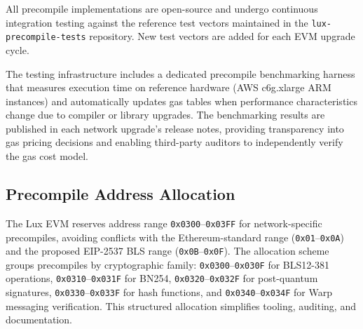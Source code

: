 \documentclass[11pt,a4paper]{article}
\begin{document}
All precompile implementations are open-source and undergo continuous integration testing against the reference test vectors maintained in the \texttt{lux-precompile-tests} repository. New test vectors are added for each EVM upgrade cycle.

The testing infrastructure includes a dedicated precompile benchmarking harness that measures execution time on reference hardware (AWS c6g.xlarge ARM instances) and automatically updates gas tables when performance characteristics change due to compiler or library upgrades. The benchmarking results are published in each network upgrade's release notes, providing transparency into gas pricing decisions and enabling third-party auditors to independently verify the gas cost model.

\subsection{Precompile Address Allocation}

The Lux EVM reserves address range \texttt{0x0300}--\texttt{0x03FF} for network-specific precompiles, avoiding conflicts with the Ethereum-standard range (\texttt{0x01}--\texttt{0x0A}) and the proposed EIP-2537 BLS range (\texttt{0x0B}--\texttt{0x0F}). The allocation scheme groups precompiles by cryptographic family: \texttt{0x0300}--\texttt{0x030F} for BLS12-381 operations, \texttt{0x0310}--\texttt{0x031F} for BN254, \texttt{0x0320}--\texttt{0x032F} for post-quantum signatures, \texttt{0x0330}--\texttt{0x033F} for hash functions, and \texttt{0x0340}--\texttt{0x034F} for Warp messaging verification. This structured allocation simplifies tooling, auditing, and documentation.
\end{document}

